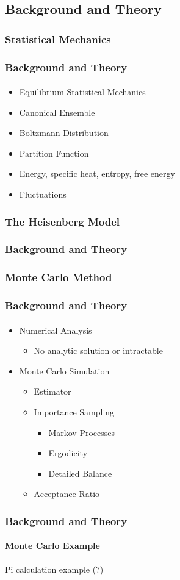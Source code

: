 \documentclass{beamer}
\begin{document}
	\subsection{Background and Theory}
	\subsubsection{Statistical Mechanics}
  \begin{frame}
    \frametitle{Background and Theory}
    \framesubtitle{}
    \begin{itemize}
    	\item Equilibrium Statistical Mechanics
    	\item Canonical Ensemble
    	\item Boltzmann Distribution
    	\item Partition Function
    	\item Energy, specific heat, entropy, free energy
    	\item Fluctuations
    \end{itemize}
  \end{frame}
  \subsubsection{The Heisenberg Model}
  \begin{frame}
    \frametitle{Background and Theory}
    \framesubtitle{}
  \end{frame}
  \subsubsection{Monte Carlo Method}
  \begin{frame}
    \frametitle{Background and Theory}
    \framesubtitle{}
    \begin{itemize}
    	\item Numerical Analysis
    	\begin{itemize}
    		\item No analytic solution or intractable
    	\end{itemize}
    	\item Monte Carlo Simulation
    	\begin{itemize}
    		\item Estimator
    		\item Importance Sampling
    		\begin{itemize}
    			\item Markov Processes
    			\item Ergodicity
    			\item Detailed Balance
    		\end{itemize}
    		\item Acceptance Ratio
    	\end{itemize}
    \end{itemize}
  \end{frame}
  \begin{frame}
    \frametitle{Background and Theory}
    \framesubtitle{Monte Carlo Example}
    \item Pi calculation example (?)
  \end{frame}
\end{document}
